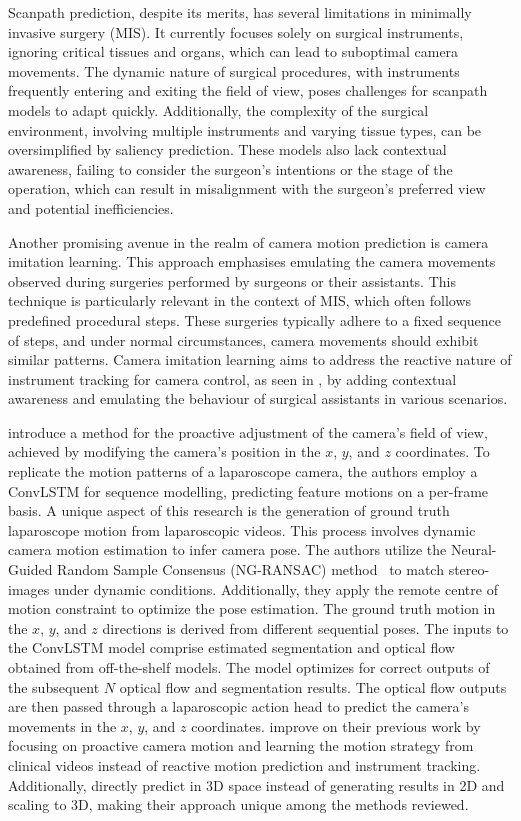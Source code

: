\documentclass[times,twocolumn,final]{elsarticle}
\begin{document}
Scanpath prediction, despite its merits, has several limitations in minimally invasive surgery (MIS). It currently focuses solely on surgical instruments, ignoring critical tissues and organs, which can lead to suboptimal camera movements. The dynamic nature of surgical procedures, with instruments frequently entering and exiting the field of view, poses challenges for scanpath models to adapt quickly. Additionally, the complexity of the surgical environment, involving multiple instruments and varying tissue types, can be oversimplified by saliency prediction. These models also lack contextual awareness, failing to consider the surgeon's intentions or the stage of the operation, which can result in misalignment with the surgeon's preferred view and potential inefficiencies.


Another promising avenue in the realm of camera motion prediction is camera imitation learning. This approach emphasises emulating the camera movements observed during surgeries performed by surgeons or their assistants. This technique is particularly relevant in the context of MIS, which often follows predefined procedural steps. These surgeries typically adhere to a fixed sequence of steps, and under normal circumstances, camera movements should exhibit similar patterns. Camera imitation learning aims to address the reactive nature of instrument tracking for camera control, as seen in \citet{li2021data,gruijthuijsen2022robotic}, by adding contextual awareness and emulating the behaviour of surgical assistants in various scenarios.


\citet{multi_fov} introduce a method for the proactive adjustment of the camera's field of view, achieved by modifying the camera's position in the $x$, $y$, and $z$ coordinates.  To replicate the motion patterns of a laparoscope camera, the authors employ a ConvLSTM for sequence modelling, predicting feature motions on a per-frame basis.
A unique aspect of this research is the generation of ground truth laparoscope motion from laparoscopic videos. This process involves dynamic camera motion estimation to infer camera pose.
The authors utilize the Neural-Guided Random Sample Consensus (NG-RANSAC) method~  \citep{brachmann2019neural} to match stereo-images under dynamic conditions.
Additionally, they apply the remote centre of motion constraint to optimize the pose estimation. The ground truth motion in the $x$, $y$, and $z$ directions is derived from different sequential poses.
The inputs to the ConvLSTM model comprise estimated segmentation and optical flow obtained from off-the-shelf models. The model optimizes for correct outputs of the subsequent $N$ optical flow and segmentation results. The optical flow outputs are then passed through a laparoscopic action head to predict the camera's movements in the $x$, $y$, and $z$ coordinates. \citet{multi_fov} improve on their previous work \citep{li2021data} by focusing on proactive camera motion and learning the motion strategy from clinical videos instead of reactive motion prediction and instrument tracking. Additionally, \citet{multi_fov} directly predict in 3D space instead of generating results in 2D and scaling to 3D, making their approach unique among the methods reviewed.
\end{document}
